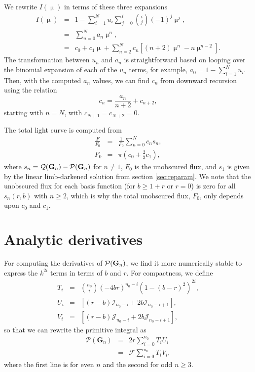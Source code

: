 \documentclass[modern]{aastex61}
\begin{document}
We rewrite $I(\upmu)$ in terms of these three expansions
\begin{eqnarray}
I(\upmu) &=& 1 - \sum_{i=1}^N u_i \sum_{j=0}^i \binom{i}{j} (-1)^j \upmu^j,\\
&=& \sum_{n=0}^N a_n \upmu^n,\\
&=& c_0 + c_1 \upmu + \sum_{n=2}^N c_n \left[(n+2)\upmu^n -n \upmu^{n-2}\right].
\end{eqnarray}
The transformation between $u_n$ and $a_n$ is straightforward based on
looping over the binomial expansion of each of the $u_n$ terms, for
example, $a_0 = 1 - \sum_{i=1}^N u_i$.  Then,
with the computed $a_n$ values, we can find $c_n$ from downward recursion
using the relation
\begin{equation}
c_n = \frac{a_n}{n+2} + c_{n+2},
\end{equation}
starting with $n=N$, with $c_{N+1}=c_{N+2}=0$.

The total light curve is computed from
\begin{eqnarray}
\frac{F}{F_0} &=& \frac{1}{F_0}\sum_{n=0}^N c_n s_n,\\
F_0 &=& \pi(c_0+ \tfrac{2}{3} c_1),
\end{eqnarray}
where $s_n = \mathcal{Q}({\mathbf{G}}_n) - \mathcal{P}({\mathbf{G}}_n)$ for $n \ne 1$,
$F_0$ is the unobscured flux, and $s_1$ is given by the linear limb-darkened solution 
from section \ref{sec:reparam}.
We note that the unobscured flux for each basis function (for $b \ge 1+r$ or $r=0$) is zero for
all $s_n(r,b)$ with $n \ge 2$, which is why the total unobscured flux,
$F_0$, only depends upon $c_0$ and $c_1$.

\section{Analytic derivatives}

For computing the derivatives of $\mathcal{P}({\mathbf{G}}_n)$, we find it more numerically 
stable to express the $k^{2i}$ terms in terms of $b$ and $r$.  For compactness, we define
\begin{eqnarray}
T_i &=&  \binom{n_0}{i}(-4br)^{n_0-i}(1-(b-r)^2)^{2i},\\
U_i &=&  \left[(r-b)\mathcal{I}_{n_0-i} + 2b \mathcal{I}_{n_0-i+1}\right],\\
V_i &=&  \left[(r-b)\mathcal{J}_{n_0-i} + 2b \mathcal{J}_{n_0-i+1}\right],
\end{eqnarray}
so that we can rewrite the primitive integral as
\begin{eqnarray}
\mathcal{P}(\mathbf{G}_n) &=& 2r \sum_{i=0}^{n_0} T_i U_i\\
&=& \mathcal{F} \sum_{i=0}^{n_0} T_i V_i,
\end{eqnarray}
where the first line is for even $n$ and the second for odd $n \ge 3$.
\end{document}
